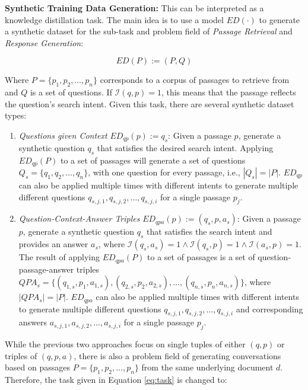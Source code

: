 \vspace{\baselineskip} %
\noindent\textbf{Synthetic Training Data Generation:} This can be interpreted as a knowledge distillation task. The main idea is to use a model $ED(\cdot)$ to generate a synthetic dataset for the sub-task and problem field of \textit{Passage Retrieval} and \textit{Response Generation}:

\begin{equation}
    ED(P) := (P, Q)
    \label{eq:task}
\end{equation}

Where $P = \{p_1, p_2, \dots, p_n\}$ corresponds to a corpus of passages to retrieve from and $Q$ is a set of questions. If $\mathcal{I}(q,p) = 1$, this means that the passage reflects the question's search intent. Given this task, there are several synthetic dataset types:

\begin{enumerate}
    \item \textit{Questions given Context} $ED_{qp}(p) := q_s$: Given a passage $p$, generate a synthetic question $q_s$ that satisfies the desired search intent. Applying $ED_{qp}(P)$ to a set of passages will generate a set of questions $Q_s = \{q_1, q_2, \dots, q_n\}$, with one question for every passage, i.e., $|Q_s| = |P|$. $ED_{qp}$ can also be applied multiple times with different intents to generate multiple different questions $q_{s,j,1}, q_{s,j,2}, \dots , q_{s,j,i}$ for a single passage $p_j$.
    \item \textit{Question-Context-Answer Triples} $ED_{qpa}(p) := (q_s, p, a_s)$: Given a passage $p$, generate a synthetic question $q_s$ that satisfies the search intent and provides an answer $a_s$, where $\mathcal{I}(q_s, a_s) = 1 \land \mathcal{I}(q_s, p) = 1 \land \mathcal{I}(a_s, p) = 1$. The result of applying $ED_{qpa}(P)$ to a set of passages is a set of question-passage-answer triples $QPA_s = \allowbreak \{(q_{1,s}, p_1, a_{1,s}), \allowbreak (q_{2,s}, p_2, a_{2,s}), \allowbreak \dots, (q_{n,s}, p_n, a_{n,s})\}$, where $|QPA_s| = |P|$. $ED_{qpa}$ can also be applied multiple times with different intents to generate multiple different questions $q_{s,j,1}, \allowbreak q_{s,j,2}, \dots , q_{s,j,i}$ and corresponding answers $a_{s,j,1}, \allowbreak a_{s,j,2}, \dots , a_{s,j,i}$ for a single passage $p_j$.
\end{enumerate}

While the previous two approaches focus on single tuples of either $(q,p)$ or triples of $(q,p,a)$, there is also a problem field of generating conversations based on passages $P = \{p_1, p_2, \dots, p_n\}$ from the same underlying document $d$. Therefore, the task given in Equation \ref{eq:task} is changed to:

